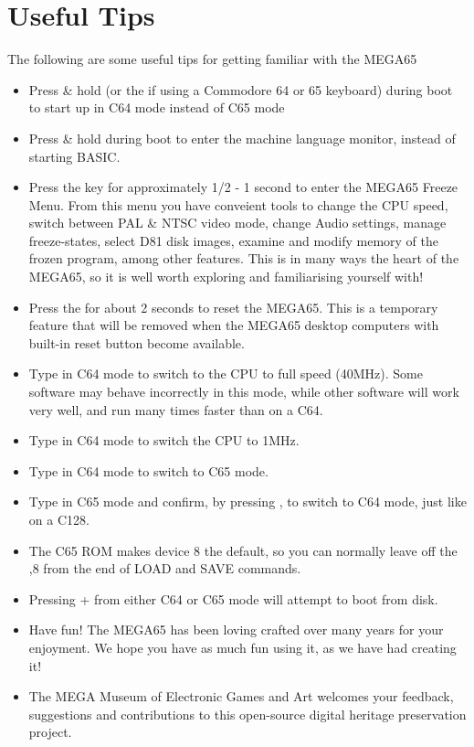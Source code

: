 								 

\section{Useful Tips}

The following are some useful tips for getting familiar with the MEGA65

\begin{itemize}

\item{Press \& hold  (or the  if using a Commodore 64 or 65 keyboard) during boot to start up in C64 mode instead of C65 mode}
 \item{Press \& hold  during boot to enter the machine language monitor, instead of starting BASIC.}
\item{Press the  key for approximately 1/2 - 1 second to enter the MEGA65 Freeze Menu.  From this menu
  you have conveient tools to change the CPU speed, switch between PAL \& NTSC video mode, change Audio settings, manage freeze-states,
   select D81 disk images, examine and modify memory of the frozen program, among other features.  This is in many ways the heart of the MEGA65, so it is well worth exploring and familiarising  yourself with!}
\item{Press the  for about 2 seconds to reset the MEGA65.  This is a temporary feature that will be removed when the MEGA65 desktop computers with built-in reset button become available.}
\item{Type  in C64 mode to switch to the CPU to full speed (40MHz). Some software may behave incorrectly in this mode, while other software will work very well, and run many times faster than on a C64.}
\item{Type  in C64 mode to switch the CPU to 1MHz.}
\item{Type  in C64 mode to switch to C65 mode.}
\item{Type  in C65 mode and confirm, by pressing , to switch to C64 mode, just like on a C128.}
\item{The C65 ROM makes device 8 the default, so you can normally leave off the ,8 from the end of LOAD and SAVE commands.}
\item{Pressing  +  from either C64 or C65 mode will attempt to boot from disk.}
\item{Have fun! The MEGA65 has been loving crafted over many years for your enjoyment. We hope you have as much fun using it, as we have had creating it!}
\item{The MEGA Museum of Electronic Games and Art welcomes your feedback, suggestions and contributions to this open-source digital heritage preservation project.}
\end{itemize}

